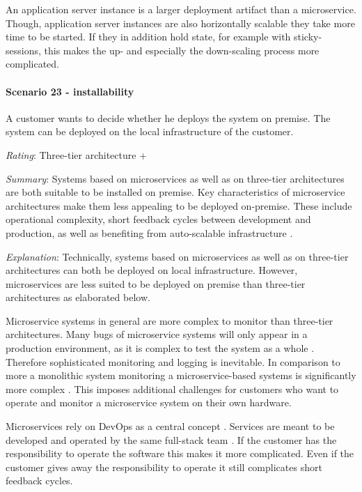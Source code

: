An application server instance is a larger deployment artifact than a microservice.
Though, application server instances are also horizontally scalable they take more time to be started.
If they in addition hold state, for example with sticky-sessions, this makes the up- and especially the down-scaling process more complicated.

\paragraph{Scenario 23 - installability}
A customer wants to decide whether he deploys the system on premise. The system can be deployed on the local infrastructure of the customer.
\label{quaMicro:s23}

\textit{Rating}: Three-tier architecture +

\textit{Summary}: Systems based on microservices as well as on three-tier architectures are both suitable to be installed on premise.
Key characteristics of microservice architectures make them less appealing to be deployed on-premise.
These include operational complexity, short feedback cycles between development and production, as well as benefiting from auto-scalable infrastructure \citep[p. 12]{Stine2015}.

\textit{Explanation}:
Technically, systems based on microservices as well as on three-tier architectures can both be deployed on local infrastructure.
However, microservices are less suited to be deployed on premise than three-tier architectures as elaborated below.

Microservice systems in general are more complex to monitor than three-tier architectures.
Many bugs of microservice systems will only appear in a production environment, as it is complex to test the system as a whole \citep[p. 147]{Newman2015}.
Therefore sophisticated monitoring and logging is inevitable.
In comparison to more a monolithic system monitoring a microservice-based systems is significantly more complex \citep[p. 155]{Newman2015}.
This imposes additional challenges for customers who want to operate and monitor a microservice system on their own hardware.

Microservices rely on DevOps as a central concept \cite{Cockcroft2014}.
Services are meant to be developed and operated by the same full-stack team \cite{Vogels2006}.
If the customer has the responsibility to operate the software this makes it more complicated.
Even if the customer gives away the responsibility to operate it still complicates short feedback cycles.

